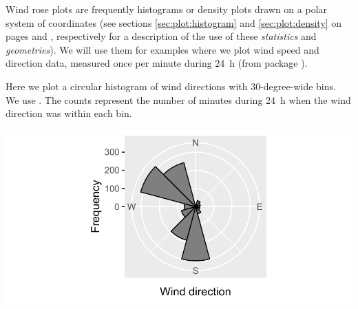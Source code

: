 \documentclass[krantz2]{krantz}\usepackage{knitr}
\begin{document}
Wind rose plots are frequently histograms or density plots drawn on a polar system of coordinates (see sections \ref{sec:plot:histogram} and \ref{sec:plot:density} on pages \pageref{sec:plot:histogram} and \pageref{sec:plot:density}, respectively for a description of the use of these \emph{statistics} and \emph{geometries}). We will use them for examples where we plot wind speed and direction data, measured once per minute during 24~h (from package ).

Here we plot a circular histogram of wind directions with 30-degree-wide bins. We use . The counts represent the number of minutes during 24~h when the wind direction was within each bin.

\begin{knitrout}\footnotesize
{}\color{fgcolor}\begin{kframe}
\begin{alltt}
 \hlkwb{<-}    \hlopt{+}
  \hlstd{()} \hlopt{+}
  \hlstd{(} \hlstd{=} \hlstd{(}\hlstd{,} \hlstd{,} \hlstd{,} \hlstd{),}
                      \hlstd{=} \hlstd{(}\hlstd{,} \hlstd{,} \hlstd{,} \hlstd{),}
                      \hlstd{=} \hlstd{(}\hlstd{,} \hlstd{),}
                      \hlstd{=} \hlstd{(}\hlstd{,} \hlstd{),}
                      \hlstd{=} \hlstd{)}
 \hlopt{+} \hlstd{(} \hlstd{=} \hlstd{,}  \hlstd{=} \hlstd{,}  \hlstd{=} \hlstd{,}
              \hlstd{=} \hlstd{,}  \hlstd{=} \hlstd{)} \hlopt{+} \hlstd{(} \hlstd{=} \hlstd{)}
\end{alltt}
\end{kframe}

{\centering \includegraphics[width=.7\textwidth]{figure/pos-wind-05-1} 

}


\end{knitrout}
\end{document}
